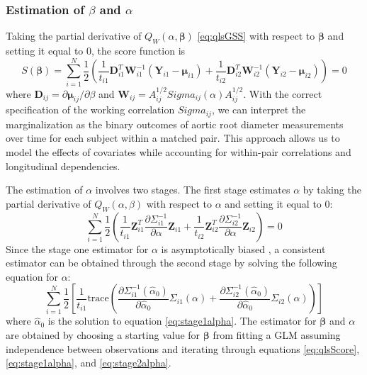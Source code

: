 \documentclass[
]{aft}
\begin{document}
\subsubsection{\texorpdfstring{Estimation of \(\beta\) and
\(\alpha\)}{Estimation of \textbackslash beta and \textbackslash alpha}}\label{estimation-of-beta-and-alpha}

Taking the partial derivative of \(Q_W(\alpha, \boldsymbol{\beta})\)
\eqref{eq:qlsGSS} with respect to \(\boldsymbol{\beta}\) and setting it
equal to 0, the score function is \begin{equation}
S(\boldsymbol{\beta}) = \sum_{i=1}^N \frac{1}{2} \left(\frac{1}{t_{i1}}\boldsymbol{D}_{i1}^T \boldsymbol{W}_{i1}^{-1}(\boldsymbol{Y}_{i1} - \boldsymbol{\mu}_{i1}) + \frac{1}{t_{i2}}\boldsymbol{D}_{i2}^T \boldsymbol{W}_{i2}^{-1}(\boldsymbol{Y}_{i2} - \boldsymbol{\mu}_{i2})\right) = 0  \label{eq:qlsScore}
\end{equation} where
\(\boldsymbol{D}_{ij} = \partial \boldsymbol{\mu}_{ij} / \partial \beta\)
and
\(\boldsymbol{W}_{ij} = A_{ij}^{1/2} Sigma_{ij}(\alpha) A_{ij}^{1/2}\).
With the correct specification of the working correlation
\(Sigma_{ij}\), we can interpret the marginalization as the binary
outcomes of aortic root diameter measurements over time for each subject
within a matched pair. This approach allows us to model the effects of
covariates while accounting for within-pair correlations and
longitudinal dependencies.

The estimation of \(\alpha\) involves two stages. The first stage
estimates \(\alpha\) by taking the partial derivative of
\(Q_W(\alpha, \beta)\) with respect to \(\alpha\) and setting it equal
to 0: \begin{equation}
\sum_{i=1}^N \frac{1}{2} \left(\frac{1}{t_{i1}}\boldsymbol{Z}_{i1}^T\frac{\partial \Sigma_{i1}^{-1}}{\partial \alpha}\boldsymbol{Z}_{i1} + \frac{1}{t_{i2}}\boldsymbol{Z}_{i2}^T \frac{\partial \Sigma_{i2}^{-1}}{\partial \alpha}\boldsymbol{Z}_{i2}\right) = 0  \label{eq:stage1alpha}
\end{equation} Since the stage one estimator for \(\alpha\) is
asymptotically biased \citep{CHAGANTY1999145}, a consistent estimator
can be obtained through the second stage by solving the following
equation for \(\alpha\): \begin{equation}
\sum_{i=1}^N \frac{1}{2} \left[\frac{1}{t_{i1}}\text{trace}\left(\frac{\partial \Sigma_{i1}^{-1} (\hat{\alpha}_0)}{\partial \hat{\alpha}_0}\Sigma_{i1}(\alpha)+\frac{\partial \Sigma_{i2}^{-1} (\hat{\alpha}_0)}{\partial \hat{\alpha}_0}\Sigma_{i2}(\alpha)\right)\right] \label{eq:stage2alpha}
\end{equation} where \(\hat{\alpha}_0\) is the solution to equation
\eqref{eq:stage1alpha}. The estimator for \(\boldsymbol{\beta}\) and
\(\alpha\) are obtained by choosing a starting value for
\(\boldsymbol{\beta}\) from fitting a GLM assuming independence between
observations and iterating through equations \eqref{eq:qlsScore},
\eqref{eq:stage1alpha}, and \eqref{eq:stage2alpha}.
\end{document}
